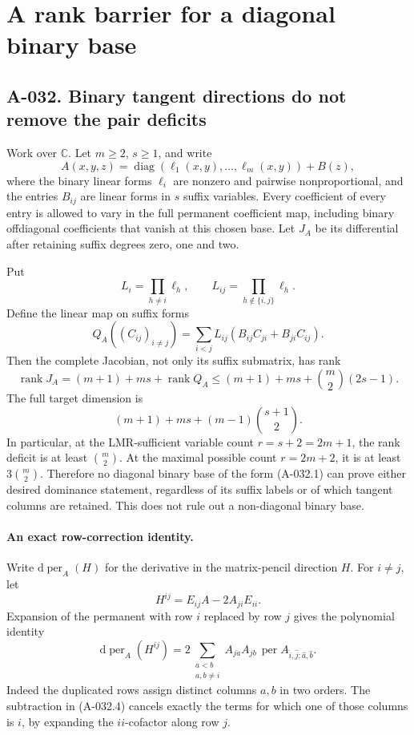 \section{A rank barrier for a diagonal binary base}

\subsection*{A-032. Binary tangent directions do not remove the pair deficits}
Work over \(\mathbb C\). Let \(m\geq2\), \(s\geq1\), and write
\[
 A(x,y,z)=\operatorname{diag}(\ell_1(x,y),\ldots,\ell_m(x,y))+B(z),
                                                               \tag{A-032.1}
\]
where the binary linear forms \(\ell_i\) are nonzero and pairwise
nonproportional, and the entries \(B_{ij}\) are linear forms in
\(s\) suffix variables. Every coefficient of every entry is
allowed to vary in the full permanent coefficient map, including
binary offdiagonal coefficients that vanish at this chosen base.
Let \(J_A\) be its differential after retaining suffix degrees
zero, one and two.

Put
\[
 L_i=\prod_{h\ne i}\ell_h,\qquad
 L_{ij}=\prod_{h\notin\{i,j\}}\ell_h.
\]
Define the linear map on suffix forms
\[
 Q_A((C_{ij})_{i\ne j})
      =\sum_{i<j}L_{ij}(B_{ij}C_{ji}+B_{ji}C_{ij}).              \tag{A-032.2}
\]
Then the complete Jacobian, not only its suffix submatrix, has rank
\[
                 \operatorname{rank}J_A
                         =(m+1)+ms+\operatorname{rank}Q_A
                         \leq(m+1)+ms+\binom m2(2s-1).          \tag{A-032.3}
\]
The full target dimension is
\[
                  (m+1)+ms+(m-1)\binom{s+1}{2}.
\]
In particular, at the LMR-sufficient variable count
\(r=s+2=2m+1\), the rank deficit is at least \(\binom m2\).
At the maximal possible count \(r=2m+2\), it is at least
\(3\binom m2\). Therefore no diagonal binary base of the form
(A-032.1) can prove either desired dominance statement, regardless
of its suffix labels or of which tangent columns are retained.
This does not rule out a non-diagonal binary base.

\paragraph{An exact row-correction identity.}
Write \(\mathrm d\operatorname{per}_A(H)\) for the derivative
in the matrix-pencil direction \(H\). For \(i\ne j\), let
\[
                      H^{ij}=E_{ij}A-2A_{ji}E_{ii}.             \tag{A-032.4}
\]
Expansion of the permanent with row \(i\) replaced by row \(j\)
gives the polynomial identity
\[
 \mathrm d\operatorname{per}_A(H^{ij})
  =2\!\!\sum_{\substack{a<b\\a,b\ne i}}
       A_{ja}A_{jb}\,
       \operatorname{per}A_{\widehat i,\widehat j;\widehat a,\widehat b}.
                                                               \tag{A-032.5}
\]
Indeed the duplicated rows assign distinct columns \(a,b\) in
two orders. The subtraction in (A-032.4) cancels exactly the
terms for which one of those columns is \(i\), by expanding
the \(ii\)-cofactor along row \(j\).

